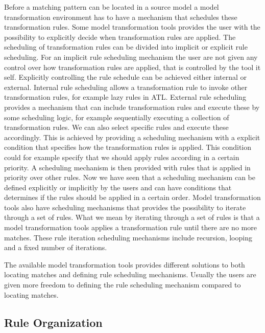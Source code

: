 Before a matching pattern can be located in a source model a model
transformation environment has to have a mechanism that schedules these
transformation rules. Some model transformation tools provides the user with the
possibility to explicitly decide when transformation rules are applied. The
scheduling of transformation rules can be divided into implicit or explicit rule
scheduling. For an implicit rule scheduling mechanism the user are not given any
control over how transformation rules are applied, that is controlled by the
tool it self. Explicitly controlling the rule schedule can be achieved either
internal or external. Internal rule scheduling allows a transformation rule to
invoke other transformation rules, for example lazy rules in ATL. External
rule scheduling provides a mechanism that can include transformation rules and
execute these by some scheduling logic, for example sequentially executing a
collection of transformation rules. We can also select specific rules and
execute these accordingly. This is achieved by providing a scheduling mechanism
with a explicit condition that specifies how the transformation rules is
applied. This condition could for example specify that we should apply rules
according in a certain priority. A scheduling mechanism is then provided
with rules that is applied in priority over other rules. Now we have seen that a
scheduling mechanism can be defined explicitly or implicitly by the users and
can have conditions that determines if the rules should be applied in a certain
order. Model transformation tools also have scheduling mechanisms that provides
the possibility to iterate through a set of rules. What we mean by iterating
through a set of rules is that a model transformation tools applies a
transformation rule until there are no more matches. These rule iteration
scheduling mechanisms include recursion, looping and a fixed number of
iterations.

The available model transformation tools provides different solutions to both
locating matches and defining rule scheduling mechanisms. Usually the users are
given more freedom to defining the rule scheduling mechanism compared to
locating matches.

\subsection{Rule Organization}

